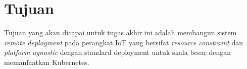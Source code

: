 \section{Tujuan}

Tujuan yang akan dicapai untuk tugas akhir ini adalah membangun sistem \textit{remote deployment} pada perangkat IoT yang bersifat \textit{resource constraint} dan \textit{platform agnostic} dengan standard deployment untuk skala besar dengan memanfaatkan Kubernetes.
